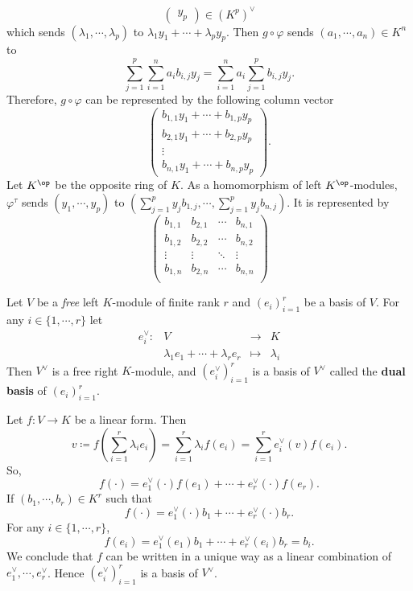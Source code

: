 \begin{exampleenv}
$$\begin{pmatrix}
    y_p
\end{pmatrix}
\in \left(K^p\right)^\vee
$$
which sends $\left(\lambda_1,\cdots,\lambda_p\right)$ to $\lambda_1 y_1 + \cdots +\lambda_p y_p$. Then $ g \circ \varphi$ sends $\left(a_1,\cdots, a_n\right)\in K^n$ to 
$$
\sum_{j=1}^{p}\sum_{i=1}^{n} a_i b_{i,j} y_j = \sum_{i=1}^{n}a_i\sum_{j=1}^{p} b_{i,j} y_j.
$$
Therefore, $g\circ \varphi$ can be represented by the following column vector
$$
\begin{pmatrix}
    b_{1,1} y_1 + \cdots + b_{1,p} y_p\\
    b_{2,1} y_1 + \cdots + b_{2,p} y_p\\
    \vdots\\
    b_{n,1} y_1 + \cdots + b_{n,p} y_p
\end{pmatrix}.
$$
Let $K^\op$ be the opposite ring of $K$. As a homomorphism of left $K^\op$-modules, $\varphi^\tau$ sends $\left(y_1,\cdots, y_p\right)$ to $\left(\sum_{j = 1}^{p} y_j b_{1,j}, \cdots , \sum_{j = 1}^{p} y_j b_{n,j}\right)$. It is represented by 
$$
\begin{pmatrix}
    b_{1,1} & b_{2,1} & \cdots & b_{n,1} \\
    b_{1,2} & b_{2,2} & \cdots & b_{n,2} \\
    \vdots & \vdots & \ddots & \vdots\\
    b_{1,n} & b_{2,n} & \cdots & b_{n,n} \\
\end{pmatrix}
$$
\end{exampleenv}
\begin{propositionenv}
    Let $V$ be a \textit{free} left $K$-module of finite rank $r$ and $\left(e_i\right)_{i=1}^{r}$ be a basis of $V$. For any $i \in \{1,\cdots ,r\}$ let 
    $$ 
    \begin{array}{rccl}
        e_i^\vee : & V & \longrightarrow & K\\
        & \lambda_1 e_1 + \cdots + \lambda_r e_r &\longmapsto & \lambda_i
    \end{array}
    $$
    Then $V^\vee$ is a free right $K$-module, and 
    $\left(e_i^\vee\right)_{i=1}^{r}$ is a basis of $V^\vee$ called the \textbf{dual basis} of $\left(e_i\right)_{i=1}^{r}$.
\end{propositionenv}
\begin{proofenv}
    Let $f: V\rightarrow K$ be a linear form. Then 
    $$
    v\coloneq f\left(\sum_{i=1}^{r}\lambda_i e_i\right) = \sum_{i=1}^{r}\lambda_i f(e_i)= \sum_{i=1}^{r}e_i^\vee(v) f(e_i).
    $$
    So,
    $$
    f\left(\cdot\right) = e_1^\vee \left(\cdot\right)f(e_1) + \cdots + e_r^\vee \left(\cdot\right) f(e_r).
    $$
    If $\left(b_1,\cdots ,b_r\right) \in K^r$ such that
    $$
    f\left(\cdot\right) = e_1^\vee \left(\cdot\right) b_1 + \cdots + e_r^\vee\left(\cdot\right)b_r.
    $$
    For any $i\in \{1,\cdots ,r\}$,
    $$ f(e_i) = e_1^\vee (e_1) b_1 + \cdots + e_r^\vee (e_i) b_r = b_i.
    $$
    We conclude that $f$ can be written in a unique way as a linear combination of $e_1^\vee,\cdots ,e_r^\vee$. Hence $\left(e_i^\vee\right)_{i=1}^r$ is a basis of $V^\vee$.
\end{proofenv}

